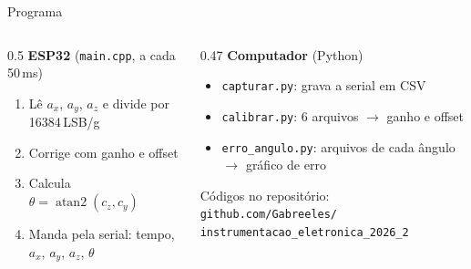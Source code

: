 \documentclass[aspectratio=169]{beamer}
\begin{document}
\begin{frame}{Programa}
\begin{columns}[T]
\begin{column}{0.5\textwidth}
\small
\textbf{ESP32} (\texttt{main.cpp}, a cada 50\,ms)
\begin{enumerate}
\item Lê $a_x$, $a_y$, $a_z$ e divide por 16384\,LSB/g
\item Corrige com ganho e offset
\item Calcula $\theta = \operatorname{atan2}(c_z, c_y)$
\item Manda pela serial: tempo, $a_x$, $a_y$, $a_z$, $\theta$
\end{enumerate}
\end{column}
\begin{column}{0.47\textwidth}
\small
\textbf{Computador} (Python)
\begin{itemize}
\item \texttt{capturar.py}: grava a serial em CSV
\item \texttt{calibrar.py}: 6 arquivos $\to$ ganho e offset
\item \texttt{erro\_angulo.py}: arquivos de cada ângulo $\to$ gráfico de erro
\end{itemize}
\vspace{6pt}
\scriptsize Códigos no repositório:\\
\texttt{github.com/Gabreeles/}\\
\texttt{instrumentacao\_eletronica\_2026\_2}
\end{column}
\end{columns}
\end{frame}
\end{document}
